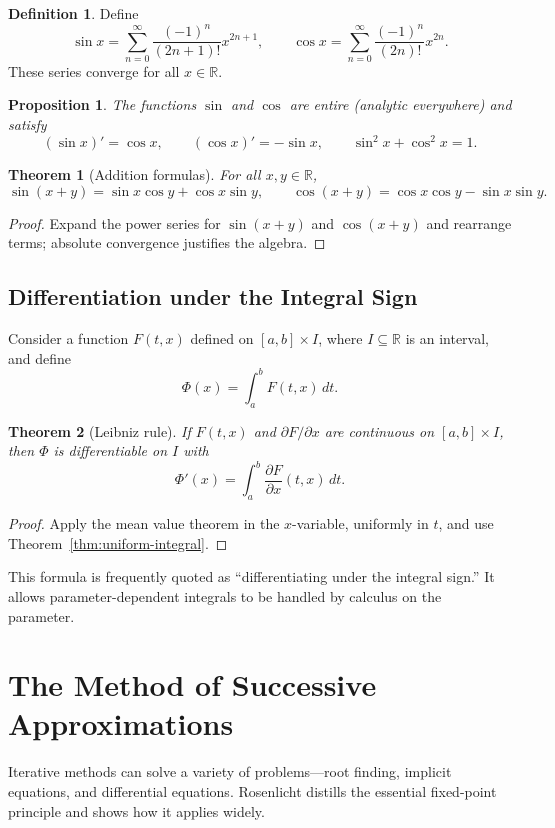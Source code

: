 \documentclass{article}
\theoremstyle{definition}
\newtheorem{definition}{Definition}[section]
\theoremstyle{plain}
\newtheorem{theorem}{Theorem}[section]
\newtheorem{proposition}{Proposition}[section]
\begin{document}
\begin{definition}
	Define
	\[
		\sin x = \sum_{n=0}^\infty \frac{(-1)^n}{(2n+1)!}x^{2n+1}, \qquad \cos x = \sum_{n=0}^\infty \frac{(-1)^n}{(2n)!}x^{2n}.
	\]
	These series converge for all $x\in \mathbb{R}$.
\end{definition}

\begin{proposition}
	The functions $\sin$ and $\cos$ are entire (analytic everywhere) and satisfy
	\[
		(\sin x)' = \cos x, \qquad (\cos x)' = -\sin x, \qquad \sin^2 x + \cos^2 x = 1.
	\]
\end{proposition}

\begin{theorem}[Addition formulas]
	For all $x,y\in \mathbb{R}$,
	\[
		\sin(x+y) = \sin x \cos y + \cos x \sin y, \qquad \cos(x+y) = \cos x \cos y - \sin x \sin y.
	\]
\end{theorem}
\begin{proof}
	Expand the power series for $\sin(x+y)$ and $\cos(x+y)$ and rearrange terms; absolute convergence justifies the algebra.
\end{proof}

\subsection{Differentiation under the Integral Sign}\label{subsec:differentiate-integral}
Consider a function $F(t,x)$ defined on $[a,b]\times I$, where $I\subseteq \mathbb{R}$ is an interval, and define
\[
	\Phi(x) = \int_a^b F(t,x)\,dt.
\]
\begin{theorem}[Leibniz rule]
	If $F(t,x)$ and $\partial F/\partial x$ are continuous on $[a,b]\times I$, then $\Phi$ is differentiable on $I$ with
	\[
		\Phi'(x) = \int_a^b \frac{\partial F}{\partial x}(t,x)\,dt.
	\]
\end{theorem}
\begin{proof}
	Apply the mean value theorem in the $x$-variable, uniformly in $t$, and use Theorem~\ref{thm:uniform-integral}.
\end{proof}

This formula is frequently quoted as ``differentiating under the integral sign.'' It allows parameter-dependent integrals to be handled by calculus on the parameter.
		
		
\section{The Method of Successive Approximations}\label{sec:successive-approximations}
Iterative methods can solve a variety of problems—root finding, implicit equations, and differential equations. Rosenlicht distills the essential fixed-point principle and shows how it applies widely.
\end{document}
